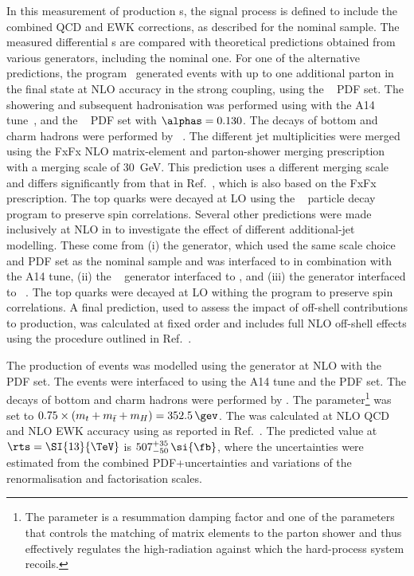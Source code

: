 \documentclass[cernpreprint, atlasdraft=false, texlive=2023, UKenglish, texmf, orcidlogo]{atlasdoc}
\begin{document}
 
In this measurement of \ttW production \xs{}s, the signal process is defined to include
the combined QCD and EWK corrections, as described for the nominal \Sherpa sample.
The measured differential \xs{}s are compared with theoretical predictions
obtained from various generators, including the nominal \Sherpa one.
For one of the alternative predictions,
the \MGNLO[2.9.3] program~\cite{Alwall:2014hca} generated \ttW events with up to one
additional parton in the final state at NLO accuracy in the strong coupling, using the \NNPDF[3.1nnlo]~\cite{NNPDF:2017mvq} PDF set.
The showering and subsequent hadronisation was performed
using \PYTHIA[8.245] with the A14 tune~\cite{ATL-PHYS-PUB-2014-021},
and the \NNPDF[2.3lo]~\cite{Ball:2014uwa} PDF set with $\alphas =
0.130$. The decays of bottom and charm hadrons were performed
by \EVTGEN[1.6.0]~\cite{Lange:2001uf}. The different jet
multiplicities were merged using the FxFx NLO matrix-element and
parton-shower merging prescription~\cite{Frederix:2012ps} with a
merging scale of 30~GeV. This prediction uses a different merging scale
and differs significantly from that in
Ref.~\cite{Frederix:2021agh}, which is also based on the FxFx
prescription. The top quarks were decayed at LO using the \MADSPIN~\cite{Frixione:2007zp,Artoisenet:2012st} particle decay program to preserve spin correlations.
Several other predictions were made inclusively at
NLO in \alphas to investigate the effect of different
additional-jet modelling. These come from (i) the \MGNLO[2.3.3] generator,
which used the same scale choice and PDF set as the nominal \SHERPA sample and
was interfaced to \PYTHIA[8.210] in combination with the A14 tune,
(ii) the \POWHEGBOX~\cite{Frixione:2007nw,Nason:2004rx,Frixione:2007vw,Alioli:2010xd,Hartanto:2015uka,FebresCordero:2021kcc} generator interfaced to \PYTHIA[8],
and (iii) the \POWHEGBOX generator interfaced to \HERWIG[7]~\cite{Bahr:2008pv,Bellm:2015jjp}.
The top quarks were decayed at LO withing the \POWHEGBOX program to preserve spin correlations.
A final prediction, used to assess the impact of off-shell
contributions to \ttW production, was calculated at fixed order and
includes full NLO off-shell effects using the procedure outlined in
Ref.~\cite{Bevilacqua:2020srb}.
 
The production of \ttH events was modelled using the
\POWHEGBOX[v2]
generator at NLO with the \NNPDF[3.0nlo]
PDF set.
The events were interfaced to \PYTHIA[8.230]
using the A14 tune and the \NNPDF[2.3lo]
PDF set. The decays of bottom and charm hadrons
were performed by \EVTGEN[1.6.0].
The \hdamp parameter\footnote{The \hdamp parameter is a resummation
damping factor and one of the parameters that controls the matching
of \POWHEG matrix elements to the parton shower and thus effectively
regulates the high-\pT radiation against which the hard-process system
recoils.} was set to $0.75 \times (m_t + m_{\bar{t}} + m_{H}) =
352.5\,\gev$.
The \xs was calculated at NLO QCD and NLO EWK accuracy using
\MGNLO as reported in Ref.~\cite{YR4}.
The predicted value at \(\rts = \SI{13}{\TeV}\) is
\(507^{+35}_{-50}\,\si{\fb}\),
where the uncertainties were estimated from the combined PDF+\alphas uncertainties and variations of the renormalisation and factorisation scales.
 
\end{document}
